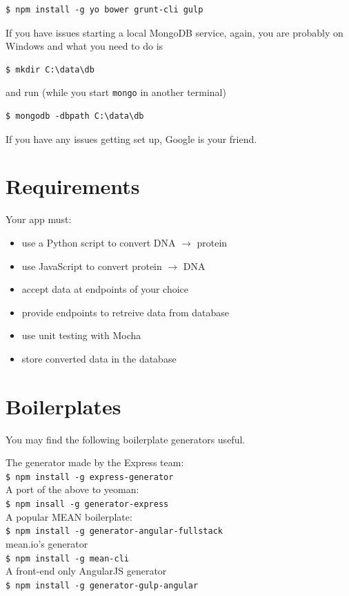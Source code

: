 \begin{verbatim}
$ npm install -g yo bower grunt-cli gulp
\end{verbatim}

If you have issues starting a
local MongoDB service, again, you are probably on Windows and what you need to
do is 

\begin{verbatim}
$ mkdir C:\data\db    
\end{verbatim}

and run (while you start \texttt{mongo} in another terminal) 

\begin{verbatim}
$ mongodb -dbpath C:\data\db  
\end{verbatim}
If you have any issues getting set up, Google is your friend. 

\section{Requirements}

Your app must:
\begin{itemize}
    \item use a Python script to convert DNA $\rightarrow$ protein
    \item use JavaScript to convert protein $\rightarrow$ DNA
    \item accept data at endpoints of your choice
    \item provide endpoints to retreive data from database
    \item use unit testing with Mocha
    \item store converted data in the database 
\end{itemize}

\section{Boilerplates}

You may find the following boilerplate generators useful.

\noindent The generator made by the Express team: \\
\texttt{\$ npm install -g express-generator} \\ 
A port of the above to yeoman: \\
\texttt{\$ npm insall -g generator-express} \\
A popular MEAN boilerplate: \\
\texttt{\$ npm install -g generator-angular-fullstack} \\
mean.io's generator \\
\texttt{\$ npm install -g mean-cli} \\
A front-end only AngularJS generator \\
\texttt{\$ npm install -g generator-gulp-angular}








